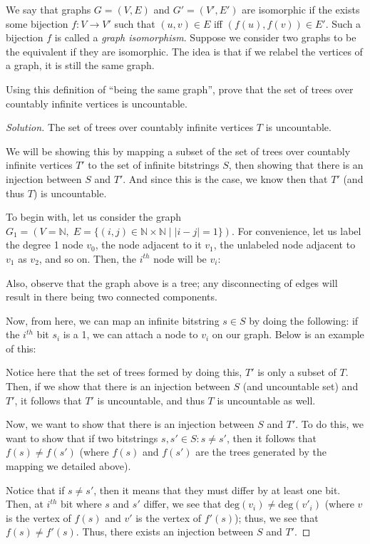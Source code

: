 \documentclass{article}
\newenvironment{solution}{\begin{proof}[Solution]}{\end{proof}}
\begin{document}
\begin{hw}
	We say that graphs $G = (V, E)$ and $G' = (V', E')$ are isomorphic if
	the exists some bijection $f:V\rightarrow V'$ such that $(u,v)\in E$ iff
	$(f(u),f(v))\in E'$. Such a bijection $f$ is called a \emph{graph isomorphism}.
	Suppose we consider two graphs to be the equivalent if they are isomorphic. The
	idea is that if we relabel the vertices of a graph, it is still the same graph.
	
	Using this definition of ``being the same graph'', prove that the set of trees over countably infinite vertices is uncountable.
\end{hw}
\begin{solution}
	The set of trees over countably infinite vertices $T$ is uncountable.
	
	We will be showing this by mapping a subset of the set of trees over countably infinite vertices $T'$ to the set of infinite bitstrings $S$, then showing that there is an injection between $S$ and $T'$. And since this is the case, we know then that $T'$ (and thus $T$) is uncountable.
	
	To begin with, let us consider the graph $G_{1} = (V=\mathbb{N},\; E=\{(i,j)\in \mathbb{N}\times \mathbb{N} \mid |i-j|=1\})$. For convenience, let us label the degree 1 node $v_{0}$, the node adjacent to it $v_{1}$, the unlabeled node adjacent to $v_{1}$ as $v_{2}$, and so on. Then, the $i^{th}$ node will be $v_{i}$:
	
	Also, observe that the graph above is a tree; any disconnecting of edges will result in there being two connected components.
	
	Now, from here, we can map an infinite bitstring $s \in S$ by doing the following: if the $i^{th}$ bit $s_{i}$ is a 1, we can attach a node to $v_{i}$ on our graph. Below is an example of this:
	
	Notice here that the set of trees formed by doing this, $T'$ is only a subset of $T$. Then, if we show that there is an injection between $S$ (and uncountable set) and $T'$, it follows that $T'$ is uncountable, and thus $T$ is uncountable as well.
	
	Now, we want to show that there is an injection between $S$ and $T'$. To do this, we want to show that if two bitstrings $s, s' \in S : s \not= s'$, then it follows that $f(s) \not= f(s')$ (where $f(s)$ and $f(s')$ are the trees generated by the mapping we detailed above).
	
	Notice that if $s \not= s'$, then it means that they must differ by at least one bit. Then, at $i^{th}$ bit where $s$ and $s'$ differ, we see that $\mathrm{deg}(v_{i}) \not= \mathrm{deg}(v'_{i})$ (where $v$ is the vertex of $f(s)$ and $v'$ is the vertex of $f'(s)$); thus, we see that $f(s) \not= f'(s)$. Thus, there exists an injection between $S$ and $T'$.
	

\end{solution}
\end{document}
